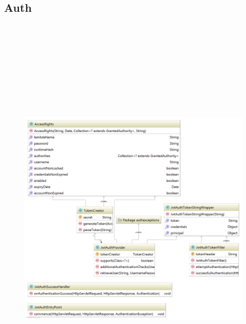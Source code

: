 \documentclass[a4paper,20pt,oneside]{book}
\begin{document}
    \subsection{Auth}
	    \begin{figure}[!hb]
	    	\includegraphics[width=18cm,height=20cm]{authdiagram}
	    \end{figure}
\end{document}
